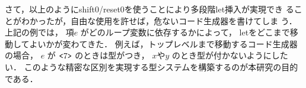 %
%
%
%
%

さて，以上のようにshift0/reset0を使うことにより多段階let挿入が実現でき
ることがわかったが，自由な使用を許せば，危ないコード生成器を書けてしま
う．上記の例では，
項$e$ がどのループ変数に依存するかによって，
letをどこまで移動してよいかが変わてきた．
例えば，トップレベルまで移動するコード生成器の場合，
$e$ が $\texttt{<}{7}\texttt{>}$ のときは型がつき，
$x$や$y$ のとき型が付かないようにしたい．
このような精密な区別を実現する型システムを構築するのが本研究の目的である．

